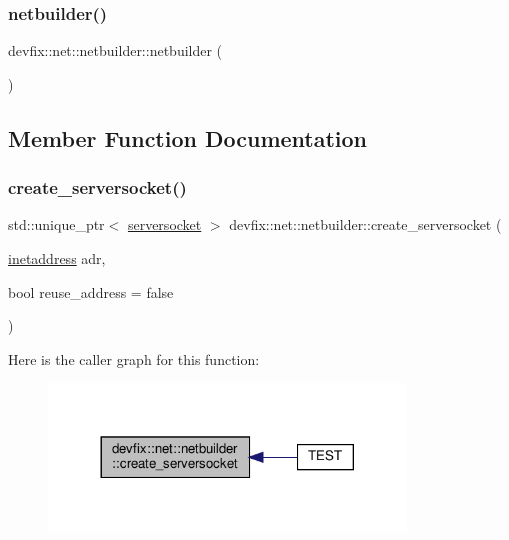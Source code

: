 \subsubsection{\texorpdfstring{netbuilder()}{netbuilder()}}
{\footnotesize\ttfamily devfix\+::net\+::netbuilder\+::netbuilder (\begin{DoxyParamCaption}{ }\end{DoxyParamCaption})\hspace{0.3cm}{\ttfamily [delete]}}



\subsection{Member Function Documentation}
\mbox{\label{structdevfix_1_1net_1_1netbuilder_a9d685e1822c0be5d68fd6ba62876798b}} 
\subsubsection{\texorpdfstring{create\+\_\+serversocket()}{create\_serversocket()}}
{\footnotesize\ttfamily std\+::unique\+\_\+ptr$<$ \hyperlink{structdevfix_1_1net_1_1serversocket}{serversocket} $>$ devfix\+::net\+::netbuilder\+::create\+\_\+serversocket (\begin{DoxyParamCaption}\item[{\hyperlink{structdevfix_1_1net_1_1inetaddress}{inetaddress}}]{adr,  }\item[{bool}]{reuse\+\_\+address = {\ttfamily false} }\end{DoxyParamCaption})\hspace{0.3cm}{\ttfamily [static]}}

Here is the caller graph for this function\+:\nopagebreak
\begin{figure}[H]
\begin{center}
\leavevmode
\includegraphics[width=269pt]{structdevfix_1_1net_1_1netbuilder_a9d685e1822c0be5d68fd6ba62876798b_icgraph}
\end{center}
\end{figure}
\mbox{\label{structdevfix_1_1net_1_1netbuilder_a9d9eb6cb050ca920aa647baaf4692405}} 

